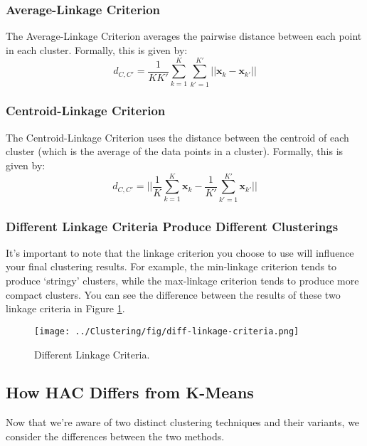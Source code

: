 \subsubsection{Average-Linkage Criterion}
The Average-Linkage Criterion averages the pairwise distance between each point in each cluster. Formally, this is given by:
\begin{equation} \label{avg-linkage-crit}
	d_{C, C'} = \frac{1}{K K'} \sum_{k=1}^{K} \sum_{k'=1}^{K'} || \textbf{x}_{k} - \textbf{x}_{k'} ||
\end{equation}

\subsubsection{Centroid-Linkage Criterion}
The Centroid-Linkage Criterion uses the distance between the centroid of each cluster (which is the average of the data points in a cluster). Formally, this is given by:
\begin{equation} \label{cent-linkage-crit}
	d_{C, C'} = || \frac{1}{K} \sum_{k=1}^{K} \textbf{x}_{k} - \frac{1}{K'} \sum_{k'=1}^{K'} \textbf{x}_{k'} ||
\end{equation}

\subsubsection{Different Linkage Criteria Produce Different Clusterings}
It's important to note that the linkage criterion you choose to use will influence your final clustering results. For example, the min-linkage criterion tends to produce `stringy' clusters, while the max-linkage criterion tends to produce more compact clusters. You can see the difference between the results of these two linkage criteria in Figure \ref{fig:diff-linkage-criteria}.

\begin{figure}
    \centering
    \texttt{[image: ../Clustering/fig/diff-linkage-criteria.png]}
    \caption{Different Linkage Criteria.}
    \label{fig:diff-linkage-criteria}
\end{figure}


\subsection{How HAC Differs from K-Means}
Now that we're aware of two distinct clustering techniques and their variants, we consider the differences between the two methods.

